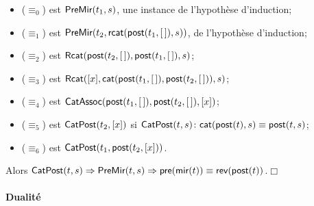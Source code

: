 \begin{itemize}

  \item (\(\equiv_0\)) est \(\textsf{PreMir}({t_1,s})\), une instance de
    l'hypothèse d'induction;

  \item (\(\equiv_1\)) est
  \(\textsf{PreMir}({t_2,\textsf{rcat}(\textsf{post}(t_1,[\,]),s)})\), de
  l'hypothèse d'induction;

  \item (\(\equiv_2\)) est
    \(\textsf{Rcat}({\textsf{post}(t_2,[\,]),\textsf{post}(t_1,[\,]),s})\);

  \item (\(\equiv_3\)) est
    \(\textsf{Rcat}({[x],\textsf{cat}(\textsf{post}(t_1,[\,]),
      \textsf{post}(t_2,[\,])),s})\);

  \item (\(\equiv_4\)) est \(\textsf{CatAssoc}({\textsf{post}(t_1,[\,]),
    \textsf{post}(t_2,[\,]),[x]})\);

  \item (\(\equiv_5\)) est
  \(\textsf{CatPost}({t_2,[x]})\) si
  \(\textsf{CatPost}({t,s}) \colon \textsf{cat}(\textsf{post}(t),s) \equiv
  \textsf{post}(t,s)\)\!;

  \item (\(\equiv_6\)) est \(\textsf{CatPost}({t_1,\textsf{post}(t_2,[x])})\).

\end{itemize}
Alors  \(\textsf{CatPost}({t,s}) \Rightarrow
\textsf{PreMir}({t,s}) \Rightarrow \textsf{pre}(\textsf{mir}(t)) \equiv
\textsf{rev}(\textsf{post}(t))\).\hfill\(\Box\)

\paragraph{Dualité}
\label{thm_duality}

